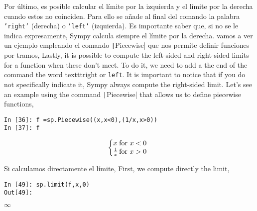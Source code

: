 \begin{paracol}{2}
Por último, es posible calcular el límite por la izquierda y el límite por la derecha cuando estos no coinciden. Para ello se añade al final del comando la palabra \texttt{'right'} (derecha) o \texttt{'left'} (izquierda). Es importante saber que, si no se le indica expresamente, Sympy calcula siempre el límite por la derecha. vamos a ver un ejemplo empleando el comando \texttt|Piecewise| que nos permite definir funciones por tramos,
\switchcolumn
Lastly, it is possible to compute the left-sided and right-sided limits for a function when these don't meet. To do it, we need to add a the end of the command the word texttt{right} or \texttt{left}. It is important to notice that if you do not specifically indicate it, Sympy always compute the right-sided limit. Let's see an example using the command \texttt|Piecewise| that allows us to define piecewise functions,
\end{paracol}
\begin{center}
	\begin{minipage}{.6\textwidth}
		\begin{verbatim}
In [36]: f =sp.Piecewise((x,x<0),(1/x,x>0))
In [37]: f
		\end{verbatim}
				\begin{equation*}
			\left\{
			\begin{array}{@{}l@{\,}l}
				x &  \text{for}\ x<0\\
			 \frac{1}{x} & \text{for}\ x>0
			\end{array}
			\right.
		\end{equation*}
	\end{minipage}
\end{center}
\begin{paracol}{2}
Si calculamos directamente el límite,
\switchcolumn
First, we compute directly the limit,
\end{paracol}
\begin{center}
	\begin{minipage}{.6\textwidth}
		\begin{verbatim}
In [49]: sp.limit(f,x,0)
Out[49]: 
		\end{verbatim}
$\infty$
	\end{minipage}
\end{center}

